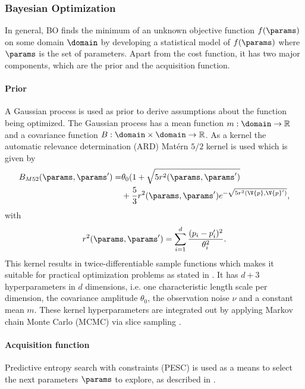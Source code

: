 \subsubsection{Bayesian Optimization}


In general, BO finds the minimum of an unknown objective function $f(\params)$ on some domain $\domain$ by developing a statistical model of $f(\params)$ where $\params$ is the set of parameters.
Apart from the cost function, it has two major components, which are the prior and the acquisition function.

\paragraph{Prior}

A Gaussian process is used as prior to derive assumptions about the function being optimized.
The Gaussian process has a mean function $m: \domain \rightarrow \mathbb{R}$ and a covariance function $B: \domain \times \domain \rightarrow \mathbb{R}$.
As a kernel the automatic relevance determination (ARD) Mat\'{e}rn $5/2$ kernel is used which is given by
\begin{align*}
B_{M52}(\params,\params^\prime)=&\theta_0(1+\sqrt{5 r^2(\params,\params^\prime)}\\
&+\frac{5}{3}r^2(\params,\params^\prime) e^{-\sqrt{5 r^2(\V{p},\V{p}^\prime)}},
\end{align*}
with
\begin{equation*}
r^2(\params,\params^\prime)=\sum_{i=1}^d \frac{(p_i-p_i^\prime)^2}{\theta_i^2}.
\end{equation*}
This kernel results in twice-differentiable sample functions which makes it suitable for practical optimization problems as stated in \cite{Snoek.2012}. 
It has $d+3$ hyperparameters in $d$ dimensions, i.e. one characteristic length scale per dimension, the covariance amplitude $\theta_0$, the observation noise $\nu$ and a constant mean $m$.
These kernel hyperparameters are integrated out by applying Markov chain Monte Carlo (MCMC) via slice sampling \cite{Neal.2003}.


\paragraph{Acquisition function}

Predictive entropy search with constraints (PESC) is used as a means to select the next parameters $\params$ to explore, as described in \cite{HernandezLobato.2015}.


